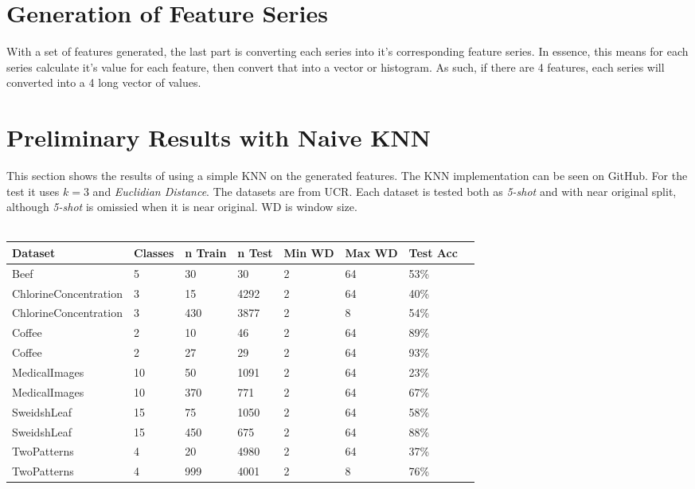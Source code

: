 \documentclass[10pt]{article}
\begin{document}
\newpage
\section{Generation of Feature Series}
With a set of features generated, the last part is converting each series into it's corresponding feature series. In essence, this means for each series calculate it's value for each feature, then convert that into a vector or histogram. As such, if there are 4 features, each series will converted into a 4 long vector of values.


\section{Preliminary Results with Naive KNN}
This section shows the results of using a simple KNN on the generated features. The KNN implementation can be seen on GitHub\cite{GitHub}. For the test it uses $k=3$ and \textit{Euclidian Distance}. The datasets are from UCR. Each dataset is tested both as \textit{5-shot} and with near original split, although \textit{5-shot} is omissied when it is near original. WD is window size.\\\\
\begin{tabular}{|l|l|l|l|l|l|l|l|}
\hline
	Dataset & Classes & n Train & n Test & Min WD & Max WD & Test Acc\\
\hline
	Beef & 5 & 30 & 30 & 2 & 64 & 53\%\\
\hline
\hline
	ChlorineConcentration & 3 & 15 & 4292 & 2 & 64 & 40\%\\
\hline
	ChlorineConcentration & 3 & 430 & 3877 & 2 & 8 & 54\%\\
\hline
\hline
	Coffee & 2 & 10 & 46 & 2 & 64 & 89\%\\
\hline
	Coffee & 2 & 27 & 29 & 2 & 64 & 93\%\\
\hline
\hline
	MedicalImages & 10 & 50 & 1091 & 2 & 64 & 23\%\\
\hline
	MedicalImages & 10 & 370 & 771 & 2 & 64 & 67\%\\
\hline
\hline
	SweidshLeaf & 15 & 75 & 1050 & 2 & 64 & 58\%\\
\hline
	SweidshLeaf & 15 & 450 & 675 & 2 & 64 & 88\%\\
\hline
\hline
	TwoPatterns & 4 & 20 & 4980 & 2 & 64 & 37\%\\
\hline
	TwoPatterns & 4 & 999 & 4001 & 2 & 8 & 76\%\\
\hline
\end{tabular}


\newpage
{}

\end{document}
